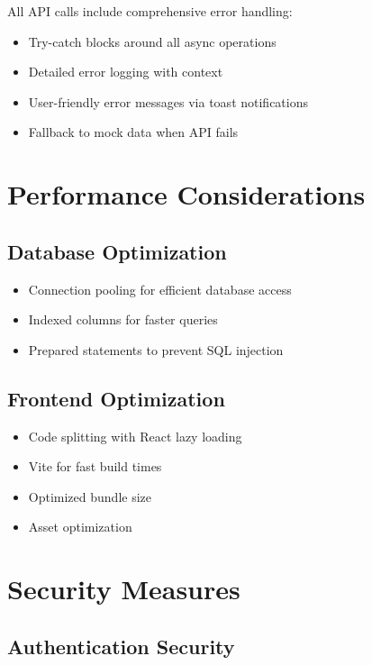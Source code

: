 \documentclass[12pt,a4paper]{article}
\begin{document}
All API calls include comprehensive error handling:
\begin{itemize}
    \item Try-catch blocks around all async operations
    \item Detailed error logging with context
    \item User-friendly error messages via toast notifications
    \item Fallback to mock data when API fails
\end{itemize}

\section{Performance Considerations}

\subsection{Database Optimization}

\begin{itemize}
    \item Connection pooling for efficient database access
    \item Indexed columns for faster queries
    \item Prepared statements to prevent SQL injection
\end{itemize}

\subsection{Frontend Optimization}

\begin{itemize}
    \item Code splitting with React lazy loading
    \item Vite for fast build times
    \item Optimized bundle size
    \item Asset optimization
\end{itemize}

\section{Security Measures}

\subsection{Authentication Security}
\end{document}

